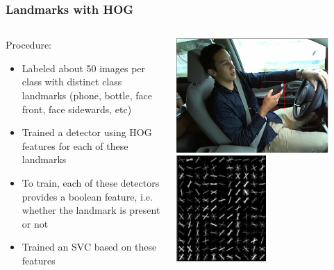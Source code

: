 \documentclass{beamer}
\begin{document}
	
	\begin{frame}
		\frametitle{Landmarks with HOG}		
		\begin{columns}
			\begin{column}{0.5\textwidth}
				Procedure:
				\begin{itemize}
					\item Labeled about 50 images per class with distinct class landmarks (phone, bottle, face front, face sidewards, etc)
					\item Trained a detector using HOG features for each of these landmarks
					\item To train, each of these detectors provides a boolean feature, i.e. whether the landmark is present or not
					\item Trained an SVC based on these features					
				\end{itemize}
			\end{column}
			\begin{column}{0.5\textwidth}
				\begin{center}
					\includegraphics[width=0.85\textwidth]{mult_HOG/HOG_phone_det}\\
					\includegraphics[width=0.5\textwidth]{mult_HOG/HOG_phone}
				\end{center}
			\end{column}
		\end{columns}
		
	\end{frame}
\end{document}
